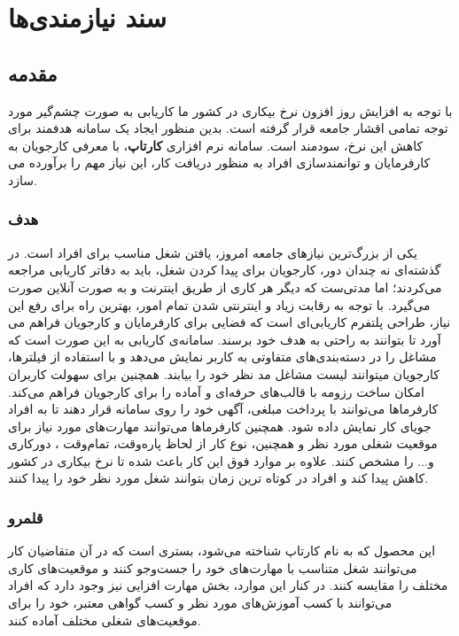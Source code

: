 \chapter{سند نیازمندی‌ها}

\section{مقدمه}	
با توجه به افزایش روز افزون نرخ بیکاری در کشور ما کاریابی به صورت چشم‌گیر مورد توجه تمامی اقشار جامعه قرار گرفته است. بدین منظور ایجاد یک سامانه هدفمند برای کاهش این نرخ، سودمند است. سامانه نرم افزاری \textbf{کارتاپ}، با معرفی کارجویان به کارفرمایان و توانمندسازی افراد به منظور دریافت کار، این نیاز مهم را برآورده می سازد.

\subsection{هدف}
یکی از بزرگ‌ترین نیازهای جامعه امروز، یافتن شغل مناسب برای افراد است. در گذشته‌ای نه چندان دور، کارجویان برای پیدا کردن شغل، باید به دفاتر کاریابی مراجعه می‌کردند؛ اما مدتی‌ست که دیگر هر کاری از طریق اینترنت و به صورت آنلاین صورت می‌گیرد. با توجه به رقابت زیاد و اینترنتی شدن تمام امور، بهترین راه برای رفع این نیاز، طراحی پلتفرم کاریابی‌‌ای است که فضایی برای کارفرمایان و کارجویان فراهم می آورد تا بتوانند به راحتی به هدف خود برسند.
سامانه‌ی کاریابی به این صورت است که مشاغل را در دسته‌بندی‌های متفاوتی به کاربر نمایش می‌دهد و با استفاده از فیلترها، کارجویان میتوانند لیست مشاغل مد نظر خود را بیابند. همچنین برای سهولت کاربران امکان ساخت رزومه با قالب‌های حرفه‌ای و آماده را برای کارجویان فراهم می‌کند. کارفرما‌ها می‌توانند با پرداخت مبلغی، آگهی خود را روی سامانه قرار دهند تا به افراد جویای کار نمایش داده شود. همچنین کارفرماها می‌توانند مهارت‌های مورد نیاز برای موقعیت شغلی مورد نظر و همچنین، نوع کار از لحاظ پاره‌وقت، تمام‌وقت ، دورکاری و... را مشخص کنند.				علاوه بر موارد فوق این کار باعث شده تا نرخ بیکاری در کشور کاهش پیدا کند و افراد در کوتاه ترین زمان بتوانند شغل مورد نظر خود را پیدا کنند.

\subsection{قلمرو}			
این محصول که به نام کارتاپ شناخته می‌شود، بستری است که در آن متقاضیان کار می‌توانند شغل متناسب با مهارت‌های خود را جست‌وجو کنند و موقعیت‌های کاری مختلف را مقایسه کنند.
در کنار این موارد، بخش مهارت افزایی نیز وجود دارد که افراد می‌توانند با کسب آموزش‌های مورد نظر و کسب گواهی معتبر، خود را برای موقعیت‌های شغلی مختلف آماده کنند.

